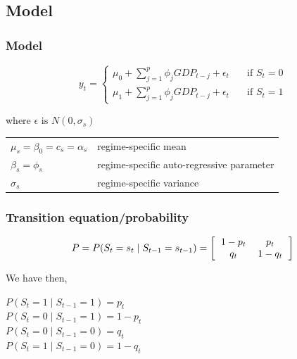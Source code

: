 \documentclass[12pt,a4paper,oneside]{book}
\begin{document}
\subsection{Model}

\subsubsection{Model}




\begin{equation}
y_{t} =   
  \begin{cases}
    \mu_{0} + \sum^p_{j = 1} \phi_j GDP_{t-j} + \epsilon_t      & \quad \text{if } S_t = 0 \\
    \mu_{1} + \sum^p_{j = 1} \phi_j GDP_{t-j} + \epsilon_t      & \quad \text{if } S_t = 1
  \end{cases}
\end{equation}

where $\epsilon \text{ is } N(0,\sigma_s)$


\begin{tabular}{l l}
    $\mu_{s} = \beta_0 = c_s = \alpha_s $    & regime-specific mean    \\
    $\beta_{s} = \phi_s$ & regime-specific  auto-regressive parameter \\
    $\sigma_{s}$ & regime-specific variance    \\

\end{tabular}

\subsubsection{Transition equation/probability}

\begin{equation}
    P = P(S_t = s_t \mid S_{t-1} = s_{t-1}) = 
\left[ \begin{tabular}{c c}
            $1 - p_{t}$	& $p_{t}$ \\ 
            $q_{t}$	& $1 - q_{t}$ \\ 
\end{tabular} \right]
\end{equation}

We have then,

$P(S_t = 1 \mid S_{t-1} = 1) = p_t$   \\ 
$P(S_t = 0 \mid S_{t-1} = 1) = 1 - p_t$ \\
$P(S_t = 0 \mid S_{t-1} = 0) = q_t$   \\
$P(S_t = 1 \mid S_{t-1} = 0) = 1- q_t$ \\
\end{document}
